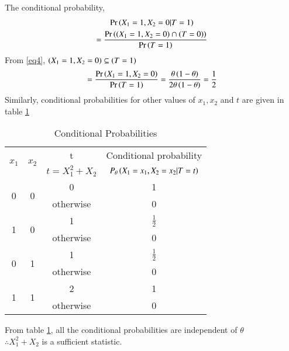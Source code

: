 \documentclass[journal,12pt,twocolumn]{IEEEtran}
\begin{document}
\begin{enumerate}
    The conditional probability,
    \begin{multline}
        \Pr\left(X_1=1,X_2=0 | T=1\right)\\
        =\frac{\Pr\left(\left(X_1=1,X_2=0\right)\cap\left(T=0\right)\right)}{\Pr\left(T=1\right)}
    \end{multline}
    From \eqref{eq4}, $\left(X_1=1,X_2=0\right) \subseteq \left(T=1\right)$
    \begin{multline}
       =\frac{\Pr\left(X_1=1,X_2=0\right)}{\Pr\left(T=1\right)}=\frac{\theta\left(1-\theta\right)}{2\theta\left(1-\theta\right)}=\frac{1}{2}
    \end{multline}
    Similarly, conditional probabilities for other values of $x_1,x_2$ and $t$ are given in table \ref{table3}
    
    \begin{center}
    \begin{table}[h!]
    \begin{tabular}[width=\columnwidth]{|c|c|c|c|}
         \hline
        \multirow{2}{*}{$x_1$} & \multirow{2}{*}{$x_2$} & t & Conditional probability\\
        & & $t=X_1^2+X_2$ & $P_\theta\left(X_1=x_1,X_2=x_2|T=t\right)$\\
        \hline
        \multirow{2}{*}{0} & \multirow{2}{*}{0} & 0 & 1\\ 
        & & otherwise & 0 \\ 
        \hline
        \multirow{2}{*}{1} & \multirow{2}{*}{0} & 1 & $\frac{1}{2}$\\ 
        & & otherwise & 0 \\ 
        \hline
        \multirow{2}{*}{0} & \multirow{2}{*}{1} & 1 & $\frac{1}{2}$\\ 
        & & otherwise & 0 \\ 
        \hline
        \multirow{2}{*}{1} & \multirow{2}{*}{1} & 2 & 1\\ 
        & & otherwise & 0 \\        
        \hline
    \end{tabular}
    \caption{Conditional Probabilities}
    \label{table3}
    \end{table}  
    \end{center}
    From table \ref{table3}, all the conditional probabilities are independent of $\theta$\\
    $\therefore X_1^2+X_2$ is a sufficient statistic.
    
\end{enumerate}
\end{document}
